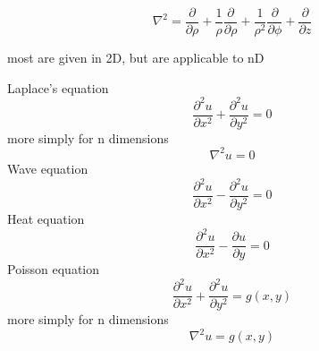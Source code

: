 \documentclass[12pt]{article}  %
\newcommand{\pfrac}[2]{\frac{\partial #1}{\partial #2}}
\newcommand{\secpfrac}[2]{\frac{\partial ^2 #1}{\partial #2 ^2}}
\newcommand{\pfraca}[1]{\frac{\partial}{\partial #1}}
\newcommand{\secpfraca}[1]{\frac{\partial}{\partial #1}}
\begin{document}
\begin{equation}
 \nabla^2 = \secpfraca{\rho} + \frac{1}{\rho} \pfraca{\rho} + \frac{1}{\rho^2} \secpfraca{\phi} + \secpfraca{z}
\end{equation}



most are given in 2D, but are applicable to nD 

Laplace's equation
\begin{equation}
 \secpfrac{u}{x} + \secpfrac{u}{y} =0
\end{equation}
more simply for n dimensions
\begin{equation}
 \nabla^2 u = 0
\end{equation}
Wave equation
\begin{equation}
 \secpfrac{u}{x} - \secpfrac{u}{y} = 0
\end{equation}
Heat equation
\begin{equation}
 \secpfrac{u}{x} - \pfrac{u}{y} = 0
\end{equation}
Poisson equation
\begin{equation}
 \secpfrac{u}{x} + \secpfrac{u}{y} = g(x,y)
\end{equation}
more simply for n dimensions
\begin{equation}
 \nabla^2 u = g(x,y)
\end{equation}
\end{document}
